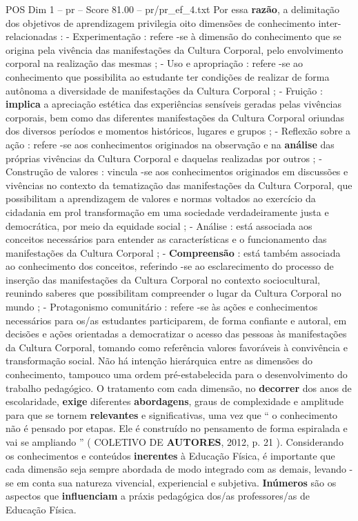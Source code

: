 \begin{textsample}{POS Dim 1 – pr – Score 81.00 – pr/pr\_ef\_4.txt}
Por essa \textbf{razão}, a delimitação dos objetivos de aprendizagem privilegia oito dimensões de conhecimento inter-relacionadas : - Experimentação : refere -se à dimensão do conhecimento que se origina pela vivência das manifestações da Cultura Corporal, pelo envolvimento corporal na realização das mesmas ; - Uso e apropriação : refere -se ao conhecimento que possibilita ao estudante ter condições de realizar de forma autônoma a diversidade de manifestações da Cultura Corporal ; - Fruição : \textbf{implica} a apreciação estética das experiências sensíveis geradas pelas vivências corporais, bem como das diferentes manifestações da Cultura Corporal oriundas dos diversos períodos e momentos históricos, lugares e grupos ; - Reflexão sobre a ação : refere -se aos conhecimentos originados na observação e na \textbf{análise} das próprias vivências da Cultura Corporal e daquelas realizadas por outros ; - Construção de valores : vincula -se aos conhecimentos originados em discussões e vivências no contexto da tematização das manifestações da Cultura Corporal, que possibilitam a aprendizagem de valores e normas voltados ao exercício da cidadania em prol transformação em uma sociedade verdadeiramente justa e democrática, por meio da equidade social ; - Análise : está associada aos conceitos necessários para entender as características e o funcionamento das manifestações da Cultura Corporal ; - \textbf{Compreensão} : está também associada ao conhecimento dos conceitos, referindo -se ao esclarecimento do processo de inserção das manifestações da Cultura Corporal no contexto sociocultural, reunindo saberes que possibilitam compreender o lugar da Cultura Corporal no mundo ; - Protagonismo comunitário : refere -se às ações e conhecimentos necessários para os/as estudantes participarem, de forma confiante e autoral, em decisões e ações orientadas a democratizar o acesso das pessoas às manifestações da Cultura Corporal, tomando como referência valores favoráveis à convivência e transformação social.
Não há intenção hierárquica entre as dimensões do conhecimento, tampouco uma ordem pré-estabelecida para o desenvolvimento do trabalho pedagógico.
O tratamento com cada dimensão, no \textbf{decorrer} dos anos de escolaridade, \textbf{exige} diferentes \textbf{abordagens}, graus de complexidade e amplitude para que se tornem \textbf{relevantes} e significativas, uma vez que “ o conhecimento não é pensado por etapas.
Ele é construído no pensamento de forma espiralada e vai se ampliando ” ( COLETIVO DE \textbf{AUTORES}, 2012, p. 21 ).
Considerando os conhecimentos e conteúdos \textbf{inerentes} à Educação Física, é importante que cada dimensão seja sempre abordada de modo integrado com as demais, levando -se em conta sua natureza vivencial, experiencial e subjetiva. \textbf{Inúmeros} são os aspectos que \textbf{influenciam} a práxis pedagógica dos/as professores/as de Educação Física.

\end{textsample}
